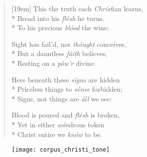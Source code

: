 \documentclass[12pt]{memoir}
\begin{document}
\begin{multicols}{2}
\begin{verse}[19em]
This the truth each \textit{Chr\'{i}st}ian learns, \\*
Bread into his \textit{fl\'{e}sh} he turns, \\*
To his precious \textit{bl\'{o}od} the wine:

Sight has fail'd, nor \textit{th\'{o}ught} conceives, \\*
But a dauntless \textit{f\'{a}ith} believes, \\*
Resting on a \textit{p\'{o}w'r} divine.

Here beneath these \textit{s\'{i}gns} are hidden \\*
Priceless things to \textit{s\'{e}nse} forbidden; \\*
Signs, not things are \textit{\'{a}ll} we see:

Blood is poured and \textit{fl\'{e}sh} is broken, \\*
Yet in either \textit{w\'{o}n}drous token \\*
Christ entire we \textit{kn\'{o}w} to be.

\end{verse}
\end{multicols}

\begin{center}

	\begin{figure}[!h]
		\texttt{[image: corpus\_christi\_tone]}
	\end{figure} 
	
\end{center}
\end{document}
